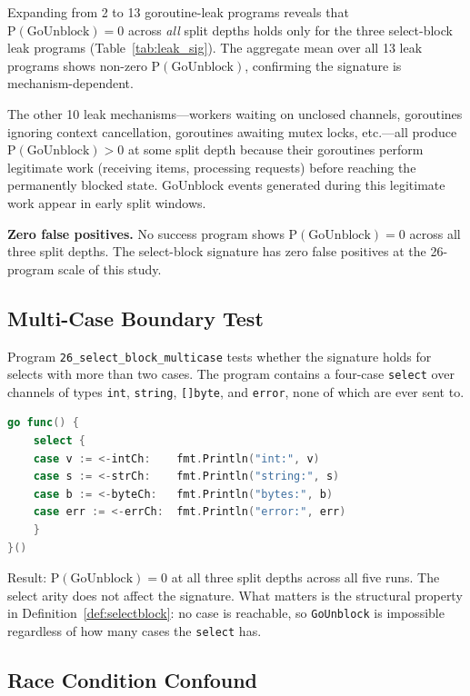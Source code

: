 \documentclass[sigconf,review,anonymous]{acmart}
\begin{document}
Expanding from 2 to 13 goroutine-leak programs reveals that $\mathrm{P(GoUnblock)=0}$
across \emph{all} split depths holds only for the three select-block leak programs
(Table~\ref{tab:leak_sig}). The aggregate mean over all 13 leak programs shows
non-zero $\mathrm{P(GoUnblock)}$, confirming the signature is mechanism-dependent.

The other 10 leak mechanisms---workers waiting on unclosed channels, goroutines
ignoring context cancellation, goroutines awaiting mutex locks, etc.---all produce
$\mathrm{P(GoUnblock)} > 0$ at some split depth because their goroutines perform
legitimate work (receiving items, processing requests) before reaching the
permanently blocked state. GoUnblock events generated during this legitimate
work appear in early split windows.

\textbf{Zero false positives.} No success program shows $\mathrm{P(GoUnblock)=0}$
across all three split depths. The select-block signature has zero false positives
at the 26-program scale of this study.

\subsection{Multi-Case Boundary Test}

Program \texttt{26\_select\_block\_multicase} tests whether the signature holds
for selects with more than two cases. The program contains a four-case
\texttt{select} over channels of types \texttt{int}, \texttt{string},
\texttt{[]byte}, and \texttt{error}, none of which are ever sent to.

\begin{lstlisting}[language=Go, caption={Four-case select-block leak
(program 26). The goroutine blocks in \texttt{GoWaiting} immediately;
no \texttt{GoUnblock} events can occur.}]
go func() {
    select {
    case v := <-intCh:    fmt.Println("int:", v)
    case s := <-strCh:    fmt.Println("string:", s)
    case b := <-byteCh:   fmt.Println("bytes:", b)
    case err := <-errCh:  fmt.Println("error:", err)
    }
}()
\end{lstlisting}

Result: $\mathrm{P(GoUnblock)=0}$ at all three split depths across all five runs.
The select arity does not affect the signature. What matters is the structural
property in Definition~\ref{def:selectblock}: no case is reachable, so
\texttt{GoUnblock} is impossible regardless of how many cases the \texttt{select} has.

\subsection{Race Condition Confound}
\label{sec:race_confound}
\end{document}
